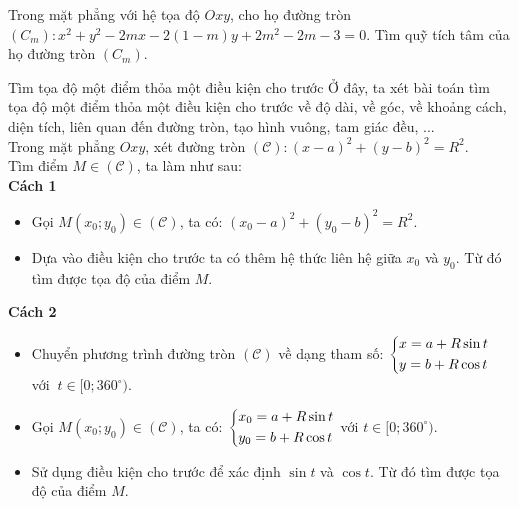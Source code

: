 \begin{bt}%
	Trong mặt phẳng với hệ tọa độ $Oxy$, cho họ đường tròn $(C_m): x^2+y^2-2mx-2(1-m)y+2m^2-2m-3=0$. Tìm quỹ tích tâm của họ đường tròn $(C_m)$.
\end{bt}


\begin{dang}{Tìm tọa độ một điểm thỏa một điều kiện cho trước}
	Ở đây, ta xét bài toán tìm tọa độ một điểm thỏa một điều kiện cho trước về độ dài, về góc, về khoảng cách, diện tích, liên quan đến đường tròn, tạo hình vuông, tam giác đều, ...\\
	Trong mặt phẳng $Oxy$, xét đường tròn $\mathscr{(C)}: (x-a)^2+(y-b)^2=R^2$.\\
	Tìm điểm $M \in \mathscr{(C)}$, ta làm như sau:\\
	\textbf{Cách 1}
	\begin{itemize}
		\item Gọi $M(x_0; y_0) \in \mathscr{(C)}$, ta có: $(x_0-a)^2+(y_0-b)^2=R^2$.
		\item Dựa vào điều kiện cho trước ta có thêm hệ thức liên hệ giữa $x_0$ và $y_0$. Từ đó tìm được tọa độ của điểm $M$.
	\end{itemize}
	\textbf{Cách 2}
	\begin{itemize}
		\item Chuyển phương trình đường tròn $\mathscr{(C)}$ về dạng tham số: $\left\{\begin{aligned}&x=a+R\sin t\\ &y=b+R\cos t\end{aligned}\right.$ với $~t \in [0; 360^\circ)$.
		\item Gọi $M(x_0; y_0) \in \mathscr{(C)}$, ta có: $\left\{\begin{aligned}&x_0=a+R\sin t\\ &y_0=b+R\cos t\end{aligned}\right.$ với $t \in [0; 360^\circ)$.
		\item Sử dụng điều kiện cho trước để xác định $\sin t$ và $\cos t$. Từ đó tìm được tọa độ của điểm $M$.
	\end{itemize}
\end{dang}

